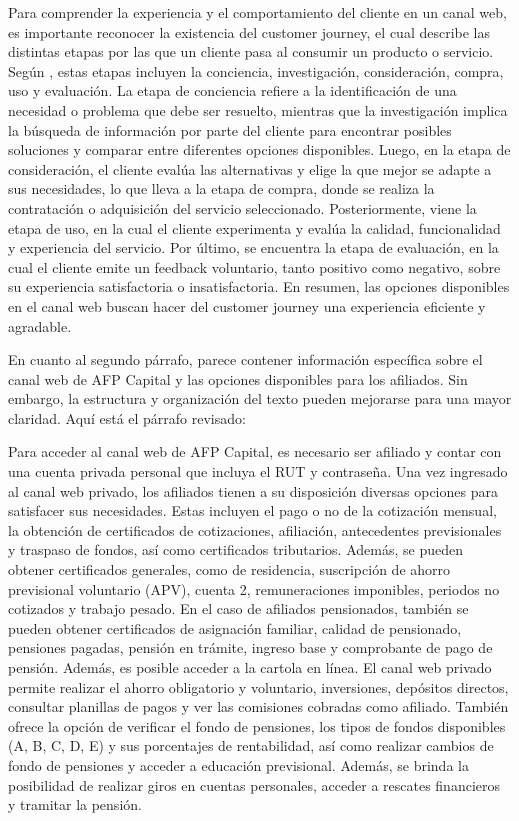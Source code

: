 Para comprender la experiencia y el comportamiento del cliente en un canal web, es importante reconocer la existencia del customer journey, el cual describe las distintas etapas por las que un cliente pasa al consumir un producto o servicio. Según \cite{lemon2016customer}, estas etapas incluyen la conciencia, investigación, consideración, compra, uso y evaluación. La etapa de conciencia refiere a la identificación de una necesidad o problema que debe ser resuelto, mientras que la investigación implica la búsqueda de información por parte del cliente para encontrar posibles soluciones y comparar entre diferentes opciones disponibles. Luego, en la etapa de consideración, el cliente evalúa las alternativas y elige la que mejor se adapte a sus necesidades, lo que lleva a la etapa de compra, donde se realiza la contratación o adquisición del servicio seleccionado. Posteriormente, viene la etapa de uso, en la cual el cliente experimenta y evalúa la calidad, funcionalidad y experiencia del servicio. Por último, se encuentra la etapa de evaluación, en la cual el cliente emite un feedback voluntario, tanto positivo como negativo, sobre su experiencia satisfactoria o insatisfactoria. En resumen, las opciones disponibles en el canal web buscan hacer del customer journey una experiencia eficiente y agradable.

En cuanto al segundo párrafo, parece contener información específica sobre el canal web de AFP Capital y las opciones disponibles para los afiliados. Sin embargo, la estructura y organización del texto pueden mejorarse para una mayor claridad. Aquí está el párrafo revisado:

Para acceder al canal web de AFP Capital, es necesario ser afiliado y contar con una cuenta privada personal que incluya el RUT y contraseña. Una vez ingresado al canal web privado, los afiliados tienen a su disposición diversas opciones para satisfacer sus necesidades. Estas incluyen el pago o no de la cotización mensual, la obtención de certificados de cotizaciones, afiliación, antecedentes previsionales y traspaso de fondos, así como certificados tributarios. Además, se pueden obtener certificados generales, como de residencia, suscripción de ahorro previsional voluntario (APV), cuenta 2, remuneraciones imponibles, periodos no cotizados y trabajo pesado. En el caso de afiliados pensionados, también se pueden obtener certificados de asignación familiar, calidad de pensionado, pensiones pagadas, pensión en trámite, ingreso base y comprobante de pago de pensión. Además, es posible acceder a la cartola en línea. El canal web privado permite realizar el ahorro obligatorio y voluntario, inversiones, depósitos directos, consultar planillas de pagos y ver las comisiones cobradas como afiliado. También ofrece la opción de verificar el fondo de pensiones, los tipos de fondos disponibles (A, B, C, D, E) y sus porcentajes de rentabilidad, así como realizar cambios de fondo de pensiones y acceder a educación previsional. Además, se brinda la posibilidad de realizar giros en cuentas personales, acceder a rescates financieros y tramitar la pensión.